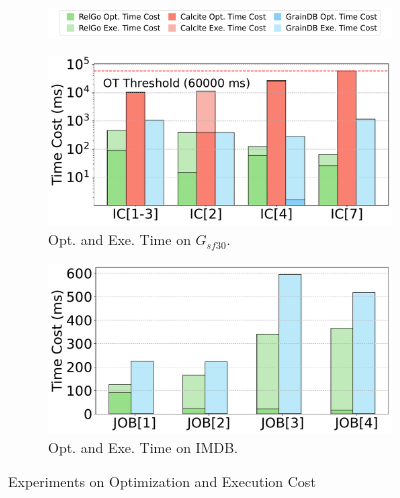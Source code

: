 \begin{figure}[ht]
    \centering
    \begin{subfigure}[b]{\linewidth}
        \centering
        \includegraphics[width=\linewidth]{./figures/exp/opt_exe_legends.pdf}
        \label{fig:exp-opt-legends}
        \vspace*{-2ex}
    \end{subfigure}
    \begin{subfigure}[b]{0.48\linewidth}
        \centering
        \includegraphics[width=\linewidth]{./figures/exp/opt_exe_ldbc.pdf}
        \caption{Opt. and Exe. Time on $G_{sf30}$.}
        \label{fig:exp-opt-ldbc}
    \end{subfigure}
    \begin{subfigure}[b]{0.48\linewidth}
        \centering
        \includegraphics[width=\linewidth]{./figures/exp/opt_exe_job.pdf}
        \caption{Opt. and Exe. Time on IMDB.}
        \label{fig:exp-opt-job}
    \end{subfigure}
    \caption{Experiments on Optimization and Execution Cost}
    \label{fig:exp-optimization}
\end{figure}

